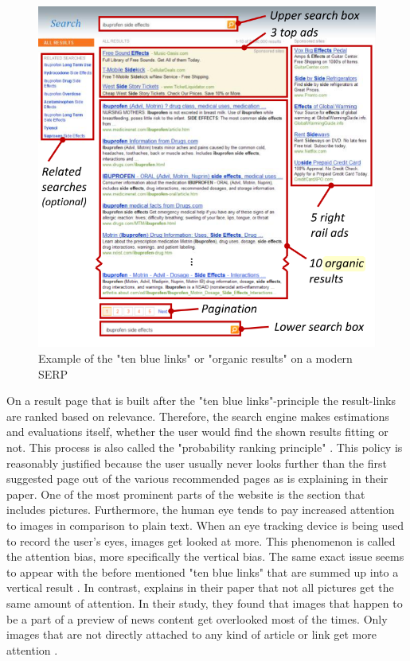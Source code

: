 \begin{figure}[!ht]
    \centering
    \includegraphics[width=1 \linewidth]{images/organic_buscher2010good.png}
    \caption{
        Example of the "ten blue links" or "organic results" on a modern SERP \autocite[3]{buscher2010good}
    }
    \label{figure:OrganicResults}
\end{figure}

On a result page that is built after the "ten blue links"-principle the result-links are ranked based on relevance. Therefore, the search engine makes estimations and evaluations itself, whether the user would find the shown results fitting or not. This process is also called the "probability ranking principle" \autocite{wang2016beyond}. This policy is reasonably justified because the user usually never looks further than the first suggested page out of the various recommended pages as \textcite{lewandowski2015evaluating} is explaining in their paper.
One of the most prominent parts of the website is the section that includes pictures. Furthermore, the human eye tends to pay increased attention to images in comparison to plain text. When an eye tracking device is being used to record the user's eyes,  images get looked at more. This phenomenon is called the attention bias, more specifically the vertical bias.
The same exact issue seems to appear with the before mentioned "ten blue links" that are summed up into a vertical result \autocite{wang2016beyond}.
In contrast, \textcite{liu2015influence} explains in their paper that not all pictures get the same amount of attention. In their study, they found that images that happen to be a part of a preview of news content get overlooked most of the times. Only images that are not directly attached to any kind of article or link get more attention \autocite{liu2015influence}.

